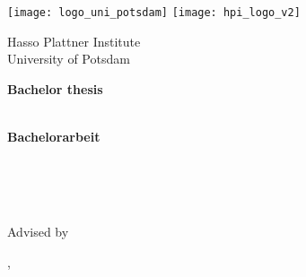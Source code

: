 \begin{titlepage}

\centering

\texttt{[image: logo\_uni\_potsdam]}
\hspace{2.5cm}
\texttt{[image: hpi\_logo\_v2]}
\vspace*{0.75cm}

\Large 
Hasso Plattner Institute\\
University of Potsdam

\vspace{2cm}

\Large
\textbf{Bachelor thesis}\\[0.5\baselineskip]
\LARGE
\textbf{\docTitle}\\[0.5\baselineskip]

\vspace{2cm}

\Large
\textbf{Bachelorarbeit}\\[0.5\baselineskip]
\LARGE
\textbf{\docTitleDE}\\[0.5\baselineskip]

\vspace{2cm}

\Large
\docAuthor\\[0.5\baselineskip]
{\normalsize \docAuthorMail}\\

\vfill

\large
Advised by \docSupervisited
\\[1.0\baselineskip]
\docChair

\vspace{1cm}
\textsf{\docCity{}, \docDate}\\ %
\end{titlepage}
